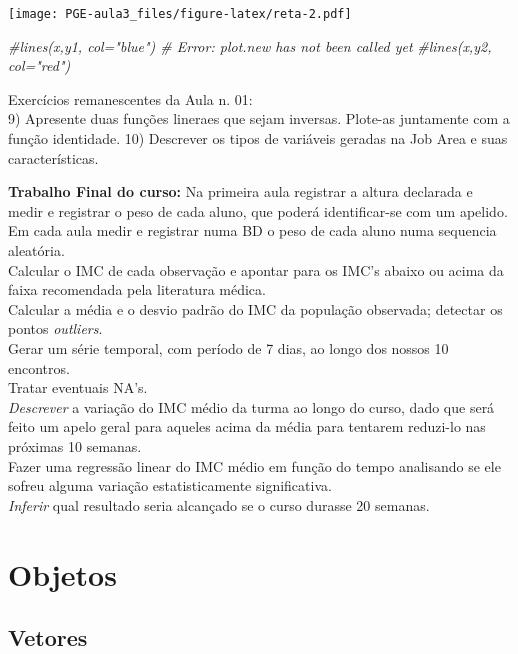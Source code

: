 \documentclass[]{article}
\newenvironment{Shaded}{\begin{snugshade}}{\end{snugshade}}
\newcommand{\CommentTok}[1]{\textcolor[rgb]{0.56,0.35,0.01}{\textit{#1}}}
\begin{document}
\texttt{[image: PGE-aula3\_files/figure-latex/reta-2.pdf]}

\begin{Shaded}
\begin{Highlighting}[]
\CommentTok{#lines(x,y1, col="blue") # Error: plot.new has not been called yet}
\CommentTok{#lines(x,y2, col="red")}
\end{Highlighting}
\end{Shaded}

Exercícios remanescentes da Aula n. 01:\\
9) Apresente duas funções lineraes que sejam inversas. Plote-as
juntamente com a função identidade. 10) Descrever os tipos de variáveis
geradas na Job Area e suas características.

\textbf{Trabalho Final do curso: } Na primeira aula registrar a altura
declarada e medir e registrar o peso de cada aluno, que poderá
identificar-se com um apelido.\\
Em cada aula medir e registrar numa BD o peso de cada aluno numa
sequencia aleatória.\\
Calcular o IMC de cada observação e apontar para os IMC's abaixo ou
acima da faixa recomendada pela literatura médica.\\
Calcular a média e o desvio padrão do IMC da população observada;
detectar os pontos \emph{outliers}.\\
Gerar um série temporal, com período de 7 dias, ao longo dos nossos 10
encontros.\\
Tratar eventuais NA's.\\
\emph{Descrever} a variação do IMC médio da turma ao longo do curso,
dado que será feito um apelo geral para aqueles acima da média para
tentarem reduzi-lo nas próximas 10 semanas.\\
Fazer uma regressão linear do IMC médio em função do tempo analisando se
ele sofreu alguma variação estatisticamente significativa.\\
\emph{Inferir} qual resultado seria alcançado se o curso durasse 20
semanas.

\section{Objetos}\label{objetos}

\subsection{Vetores}\label{vetores}
\end{document}
